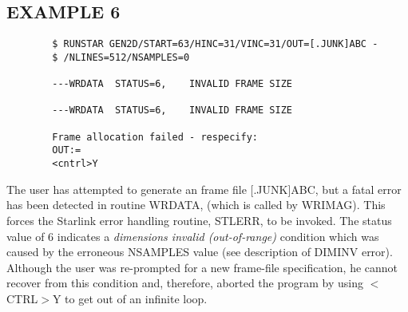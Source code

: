 \documentclass{article}
\begin{document}
\subsection {EXAMPLE 6}
\begin{verbatim}
        $ RUNSTAR GEN2D/START=63/HINC=31/VINC=31/OUT=[.JUNK]ABC -
        $ /NLINES=512/NSAMPLES=0

        ---WRDATA  STATUS=6,    INVALID FRAME SIZE

        ---WRDATA  STATUS=6,    INVALID FRAME SIZE

        Frame allocation failed - respecify:
        OUT:=
        <cntrl>Y
\end{verbatim}
The user has attempted to generate an frame file [.JUNK]ABC, but a fatal error
has been detected in routine WRDATA, (which is called by WRIMAG).
This forces the Starlink error handling routine, STLERR, to be invoked.
The status value of 6 indicates a {\em dimensions invalid (out-of-range)}
condition which was caused by the erroneous NSAMPLES value (see description of
DIMINV error).
Although the user was re-prompted for a new frame-file specification, he cannot
recover from this condition and, therefore, aborted the program by using
$<$CTRL$>$Y to get out of an infinite loop.
\end{document}
